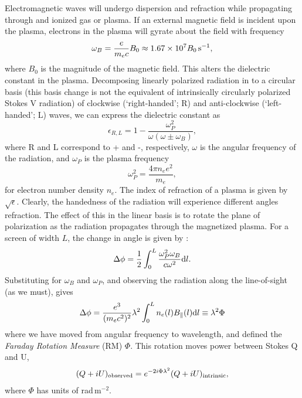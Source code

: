 Electromagnetic waves will undergo dispersion and refraction while propagating through and ionized gas or plasma. If an external magnetic field is incident upon the plasma, electrons in the plasma will gyrate about the field with frequency
\begin{equation}
\omega_B = \frac{e}{m_e c}B_0 \approx 1.67\times 10^7 B_0 {\rm\, s^{-1}},
\end{equation}
where $B_0$ is the magnitude of the magnetic field. This alters the dielectric constant in the plasma.
Decomposing linearly polarized radiation in to a circular basis (this basis change is not the equivalent of intrinsically circularly polarized Stokes V radiation) of clockwise (`right-handed'; R) and anti-clockwise (`left-handed'; L) waves, we can express the dielectric constant as
\begin{equation}
\epsilon_{R,L} = 1 - \frac{\omega_P^2}{\omega(\omega \pm \omega_B)},
\end{equation}
where R and L correspond to + and -, respectively, $\omega$ is the angular frequency of the radiation, and $\omega_P$ is the plasma frequency
\begin{equation}
\omega_P^2 = \frac{4\pi n_e e^2}{m_e},
\end{equation}
for electron number density $n_e$. The index of refraction of a plasma is given by $\sqrt{\epsilon}$. Clearly, the handedness of the radiation will experience different angles refraction. The effect of this in the linear basis is to rotate the plane of polarization as the radiation propagates through the magnetized plasma. For a screen of width $L$, the change in angle is given by \citep{Rybicki.79, TMS}:
\begin{equation}
\Delta\phi = \frac{1}{2}\int^L_0 \frac{\omega_P^2\omega_B}{c\omega^2}{\rm d}l.
\end{equation}
Substituting for $\omega_B$ and $\omega_P$, and observing the radiation along the line-of-sight (as we must), gives
\begin{equation}
\Delta\phi = \frac{e^3}{(m_e c^2)^2}\lambda^2 \int^L_0 n_e(l)B_{\parallel}(l) {\rm d}l \equiv \lambda^2\Phi
\end{equation}
where we have moved from angular frequency to wavelength, and defined the \textit{Faraday Rotation Measure} (RM) $\Phi$. This rotation moves power between Stokes Q and U,
\begin{equation}
(Q + iU)_{\rm observed} = e^{-2i\Phi\lambda^2}(Q + iU)_{\rm intrinsic},
\label{eq:astropol_faraday_rotation}
\end{equation}
where $\Phi$ has units of rad\,m$^{-2}$.

